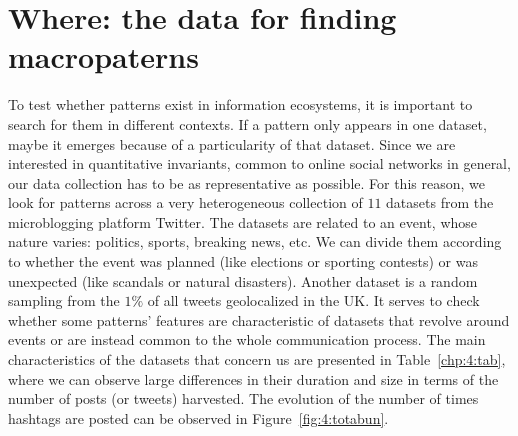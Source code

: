 \section{Where: the data  for finding macropaterns\label{chp:4:4}} %

 To test whether  patterns exist in information ecosystems, it is important to search for them in different contexts. If a pattern only appears in one dataset, maybe it emerges because of a particularity of that dataset. Since we are interested in quantitative invariants, common to online social networks in general, our data collection has to be as representative as possible. For this reason, we look for patterns across a very heterogeneous collection of $11$ datasets from the microblogging platform Twitter. The datasets are related to an event, whose nature varies: politics, sports, breaking news, etc.  We can divide them according to whether the event was planned (like elections or sporting contests) or was unexpected (like scandals or natural disasters). Another dataset is a random sampling from the $1\%$ of all tweets geolocalized in the UK. It serves to check whether some patterns' features are characteristic of datasets that revolve around events or are instead common to the whole communication process. The main characteristics of the datasets that concern us are presented in Table~\ref{chp:4:tab}, where we can observe large differences in their duration and size in terms of the number of posts (or tweets) harvested. The evolution of the number of times hashtags are posted can be observed in Figure~\ref{fig:4:totabun}. \\


